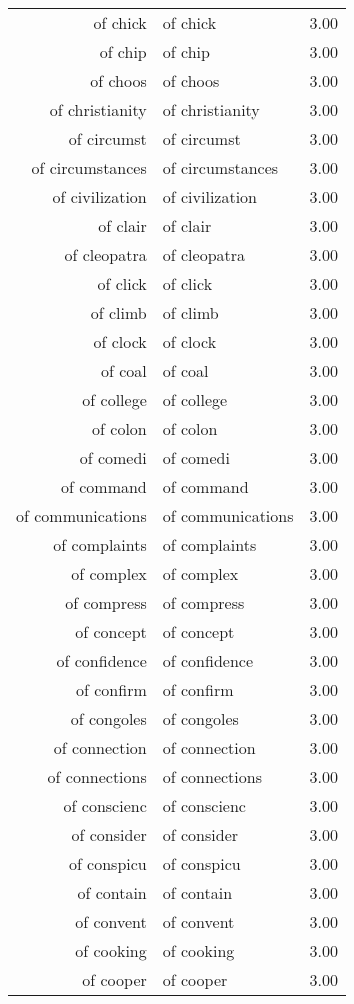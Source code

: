 \begin{table}[ht]
\begin{tabular}{rlr}
  of chick & of chick & 3.00 \\ 
  of chip & of chip & 3.00 \\ 
  of choos & of choos & 3.00 \\ 
  of christianity & of christianity & 3.00 \\ 
  of circumst & of circumst & 3.00 \\ 
  of circumstances & of circumstances & 3.00 \\ 
  of civilization & of civilization & 3.00 \\ 
  of clair & of clair & 3.00 \\ 
  of cleopatra & of cleopatra & 3.00 \\ 
  of click & of click & 3.00 \\ 
  of climb & of climb & 3.00 \\ 
  of clock & of clock & 3.00 \\ 
  of coal & of coal & 3.00 \\ 
  of college & of college & 3.00 \\ 
  of colon & of colon & 3.00 \\ 
  of comedi & of comedi & 3.00 \\ 
  of command & of command & 3.00 \\ 
  of communications & of communications & 3.00 \\ 
  of complaints & of complaints & 3.00 \\ 
  of complex & of complex & 3.00 \\ 
  of compress & of compress & 3.00 \\ 
  of concept & of concept & 3.00 \\ 
  of confidence & of confidence & 3.00 \\ 
  of confirm & of confirm & 3.00 \\ 
  of congoles & of congoles & 3.00 \\ 
  of connection & of connection & 3.00 \\ 
  of connections & of connections & 3.00 \\ 
  of conscienc & of conscienc & 3.00 \\ 
  of consider & of consider & 3.00 \\ 
  of conspicu & of conspicu & 3.00 \\ 
  of contain & of contain & 3.00 \\ 
  of convent & of convent & 3.00 \\ 
  of cooking & of cooking & 3.00 \\ 
  of cooper & of cooper & 3.00 \\ 

\end{tabular}
\end{table}
